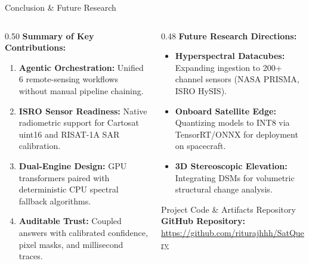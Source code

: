 \documentclass[aspectratio=169, 10pt]{beamer}
\begin{document}
\begin{frame}{Conclusion \& Future Research}
  \vspace{-0.2em}
  \begin{columns}[T]
    \begin{column}{0.50\textwidth}
      \textbf{\color{IEEEDarkBlue}Summary of Key Contributions:}
      \begin{enumerate}\setlength{\itemsep}{2.5pt}\small
        \item \textbf{Agentic Orchestration:} Unified 6 remote-sensing workflows without manual pipeline chaining.
        \item \textbf{ISRO Sensor Readiness:} Native radiometric support for Cartosat uint16 and RISAT-1A SAR calibration.
        \item \textbf{Dual-Engine Design:} GPU transformers paired with deterministic CPU spectral fallback algorithms.
        \item \textbf{Auditable Trust:} Coupled answers with calibrated confidence, pixel masks, and millisecond traces.
      \end{enumerate}
    \end{column}

    \begin{column}{0.48\textwidth}
      \textbf{\color{IEEEDarkBlue}Future Research Directions:}
      \begin{itemize}\setlength{\itemsep}{2.5pt}\small
        \item \textbf{Hyperspectral Datacubes:} Expanding ingestion to 200+ channel sensors (NASA PRISMA, ISRO HySIS).
        \item \textbf{Onboard Satellite Edge:} Quantizing models to INT8 via TensorRT/ONNX for deployment on spacecraft.
        \item \textbf{3D Stereoscopic Elevation:} Integrating DSMs for volumetric structural change analysis.
      \end{itemize}
      \vspace{0.2em}
      \begin{exampleblock}{\scriptsize Project Code \& Artifacts Repository}
        \centering\scriptsize
        \textbf{GitHub Repository:} \url{https://github.com/riturajhhh/SatQuery}
      \end{exampleblock}
    \end{column}
  \end{columns}
\end{frame}
\end{document}
